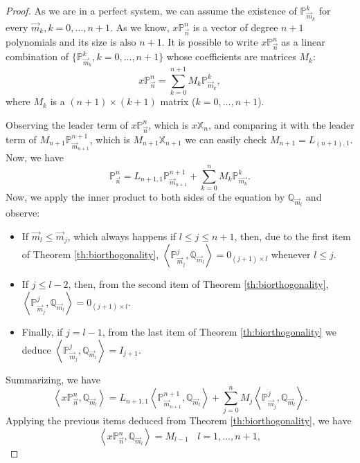 \documentclass[12pt,a4]{report}
\theoremstyle{plain}
\newcommand{\prodesc}[2]{\left\langle #1 , #2 \right\rangle}
\begin{document}
\begin{proof}
    As we are in a perfect system, we can assume the existence of $\mathbb P_{\overrightarrow{m}_k}^k$ for every $\vec m_k, k=0,\dots,n+1$. As we know, $x\mathbb P_{\vec n}^n$ is a vector of degree $n+1$ polynomials and its size is also $n+1$. It is possible to write  $x\mathbb P_{\vec n}^n$ as a linear combination of $\{\mathbb P_{\overrightarrow{m}_k}^k, k=0,\dots,n+1\}$ whose coefficients are matrices $M_k$:
    $$
    x\mathbb P_{\overrightarrow{n}}^n = \sum_{k=0}^{n+1} M_k \mathbb P_{\overrightarrow{m}_k}^k,
    $$
    where $M_k$ is a $(n+1)\times(k+1)$ matrix ($k=0,\dots,n+1$).

    Observing the leader term of $x\mathbb P_{\overrightarrow{n}}^n$, which is $x\mathbb X_{n}$, and comparing it with the leader term of $M_{n+1} \mathbb P_{\overrightarrow{m}_{n+1}}^{n+1}$, which is $M_{n+1}\mathbb X_{n+1}$ we can easily check $M_{n+1}=L_{(n+1),1}$. Now, we have
    $$
    \mathbb P_{\overrightarrow{n}}^n = L_{n+1,1}\mathbb P_{\overrightarrow{m}_{n+1}}^{n+1} + \sum_{k=0}^{n} M_k \mathbb P_{\overrightarrow{m_k}}^k.
    $$
    Now, we apply the inner product to both sides of the equation by $\mathbb Q_{\overrightarrow{m}_l}$ and observe:
    \begin{itemize}
        \item If $\overrightarrow{m}_l\leq \overrightarrow{m}_j$, which always happens if $l\leq j\leq n+1$, then, due to the first item of Theorem \ref{th:biorthogonality}, $\prodesc{\mathbb P_{\overrightarrow{m}_j}^j}{\mathbb Q_{\overrightarrow{m}_l}} = 0_{(j+1)\times l}$ whenever $l\leq j$.
        \item If $j\leq l-2$, then, from the second item of Theorem \ref{th:biorthogonality}, $\prodesc{\mathbb P_{\overrightarrow{m}_j}^j}{\mathbb Q_{\overrightarrow{m}_l}} = 0_{(j+1)\times l}.$
        \item Finally, if $j=l-1$, from the last item of Theorem \ref{th:biorthogonality} we deduce $\prodesc{\mathbb P_{\overrightarrow{m}_j}^j}{\mathbb Q_{\overrightarrow{m}_l}} = I_{j+1}.$
    \end{itemize}

    Summarizing, we have
    $$
    \prodesc{x\mathbb P_{\vec n}^n}{\mathbb Q_{\overrightarrow{m}_l}} = L_{n+1,1}\prodesc{\mathbb P_{\overrightarrow{m}_{n+1}}^{n+1}}{\mathbb Q_{\overrightarrow{m}_l}} + \sum_{j=0}^n M_j \prodesc{\mathbb P_{\overrightarrow{m}_j}^j}{\mathbb Q_{\overrightarrow{m}_l}}.
    $$
    Applying the previous items deduced from Theorem \ref{th:biorthogonality}, we have
    \begin{equation}
        \label{eq:biorthogonality-1}
        \prodesc{x\mathbb P_{\vec n}^n}{\mathbb Q_{\overrightarrow{m}_l}} = M_{l-1} \ \ \ \ l=1,\dots,n+1,
    \end{equation}


\end{proof}
\end{document}

